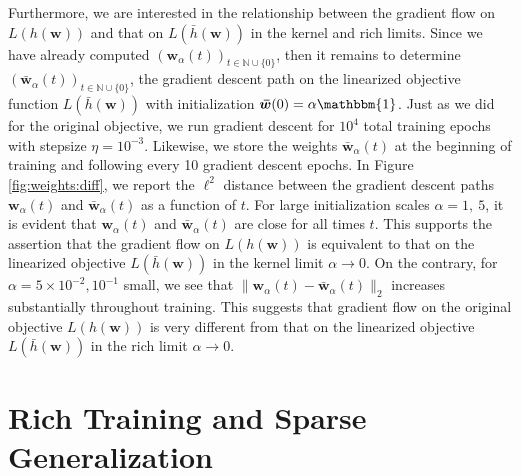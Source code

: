 \documentclass{article}
\begin{document}
Furthermore, we are interested in the relationship between the gradient flow on $L(h(\boldsymbol{w}))$ and that on $L(\bar{h}(\boldsymbol{w}))$ in the kernel and rich limits. Since we have already computed $(\boldsymbol{w}_{\alpha}(t))_{t \in \mathbb{N} \cup \{0\}}$, then it remains to determine $(\boldsymbol{\bar{w}}_{\alpha}(t))_{t \in \mathbb{N} \cup \{0\}}$, the gradient descent path on the linearized objective function $L(\bar{h}(\boldsymbol{w}))$ with initialization $\boldsymbol{\bar{w}}(0) = \alpha \mathbbm{1}$. Just as we did for the original objective, we run gradient descent for $10^4$ total training epochs with stepsize $\eta = 10^{-3}$. Likewise, we store the weights $\boldsymbol{\bar{w}}_{\alpha}(t)$ at the beginning of training and following every 10 gradient descent epochs. In Figure \ref{fig:weights:diff}, we report the $\ell^2$ distance between the gradient descent paths $\boldsymbol{w}_{\alpha}(t)$ and $\boldsymbol{\bar{w}}_{\alpha}(t)$ as a function of $t$. For large initialization scales $\alpha = 1, \ 5$, it is evident that $\boldsymbol{w}_{\alpha}(t)$ and $\boldsymbol{\bar{w}}_{\alpha}(t)$ are close for all times $t$. This supports the assertion that the gradient flow on $L(h(\boldsymbol{w}))$ is equivalent to that on the linearized objective $L(\bar{h}(\boldsymbol{w}))$ in the kernel limit $\alpha \rightarrow 0$. On the contrary, for $\alpha = 5 \times 10^{-2}, 10^{-1}$ small, we see that $\| \boldsymbol{w}_{\alpha}(t) - \boldsymbol{\bar{w}}_{\alpha}(t) \|_2$ increases substantially throughout training. This suggests that gradient flow on the original objective $L(h(\boldsymbol{w}))$ is very different from that on the linearized objective $L(\bar{h}(\boldsymbol{w}))$ in the rich limit $\alpha \rightarrow 0$.


\section{Rich Training and Sparse Generalization}\label{richgeneralization}

\pagebreak



\end{document}
